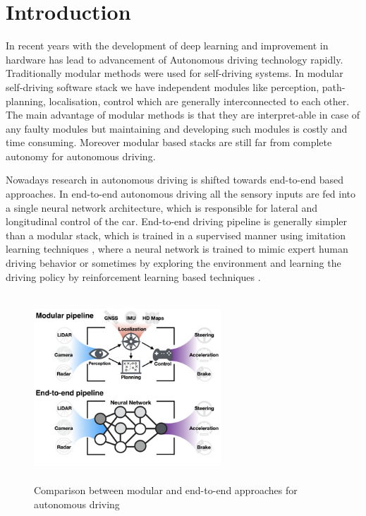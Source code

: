 

    \chapter{Introduction}
    In recent years with the development of deep learning and improvement in hardware has lead to advancement of Autonomous driving technology rapidly. Traditionally modular methods were used for self-driving systems. In modular self-driving software stack we have independent modules like perception, path-planning, localisation, control which are generally interconnected to each other. The main advantage of modular methods is that they are interpret-able in case of any faulty modules but maintaining and developing such modules is costly and time consuming. Moreover modular based stacks are still far from complete autonomy for autonomous driving.
    \par Nowadays research in autonomous driving is shifted towards end-to-end based approaches. In end-to-end autonomous driving all the sensory inputs are fed into a single neural network architecture, which is responsible for lateral and longitudinal control of the car. End-to-end driving pipeline is generally simpler than a modular stack, which is trained in a supervised manner using imitation learning techniques \cite{DBLP:journals/corr/abs-1710-02410}, \cite{pan2019agile} where a neural network is trained to mimic expert human driving behavior or sometimes by exploring the environment and learning the driving policy by reinforcement learning based techniques \cite{DBLP:journals/corr/abs-1807-00412}. 

     \begin{figure}[h]
    \centering
    \includegraphics[width=7cm, height=7cm]{images/Modularvsend.png}
    \caption{Comparison between modular and end-to-end approaches for autonomous driving \cite{DBLP:journals/corr/abs-2003-06404}}
    \end{figure}
    
